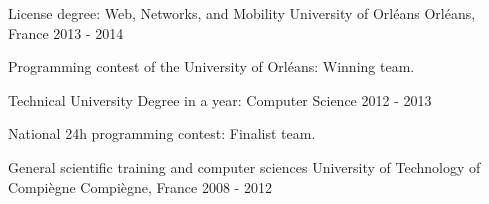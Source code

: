 \begin{cventries}
  \cventry
    {License degree: Web, Networks, and Mobility}
    {University of Orléans}
    {Orléans, France}
    {2013 - 2014}
    {
      \begin{cvitems}
        \item {Programming contest of the University of Orléans: Winning team.}
      \end{cvitems}
      \vspace{-2.0mm}
    }
  \cventry
    {Technical University Degree in a year: Computer Science}
    {}
    {}
    {2012 - 2013}
    {
      \begin{cvitems}
        \item {National 24h programming contest: Finalist team.}
      \end{cvitems}
    }
  \cventry
    {General scientific training and computer sciences}
    {University of Technology of Compiègne}
    {Compiègne, France}
    {2008 - 2012}
    {}
\end{cventries}
